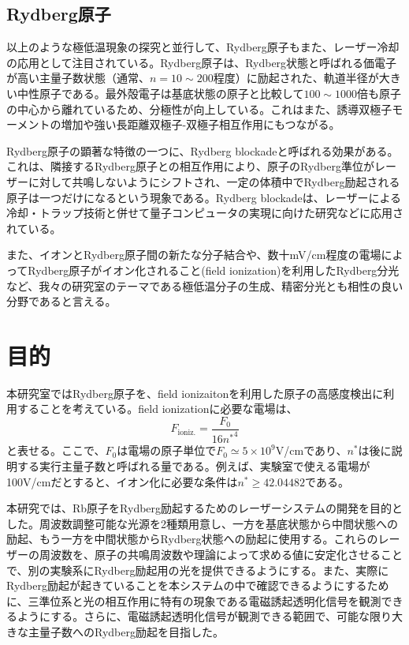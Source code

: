\documentclass[dvipdfmx]{jsreport}
\begin{document}
\subsection{Rydberg原子}
以上のような極低温現象の探究と並行して、Rydberg原子もまた、レーザー冷却の応用として注目されている。Rydberg原子は、Rydberg状態と呼ばれる価電子が高い主量子数状態（通常、$n=10\sim200$程度）に励起された、軌道半径が大きい中性原子である。最外殻電子は基底状態の原子と比較して$100\sim1000$倍も原子の中心から離れているため、分極性が向上している\cite{rydberg}。これはまた、誘導双極子モーメントの増加や強い長距離双極子-双極子相互作用にもつながる。

Rydberg原子の顕著な特徴の一つに、Rydberg blockadeと呼ばれる効果がある。これは、隣接するRydberg原子との相互作用により、原子のRydberg準位がレーザーに対して共鳴しないようにシフトされ、一定の体積中でRydberg励起される原子は一つだけになるという現象である。Rydberg blockadeは、レーザーによる冷却・トラップ技術と併せて量子コンピュータの実現に向けた研究などに応用されている。\cite{yuma}

また、イオンとRydberg原子間の新たな分子結合\cite{ion-rydberg}や、数十mV/cm程度の電場によってRydberg原子がイオン化されること(field ionization)を利用したRydberg分光\cite{yuma}など、我々の研究室のテーマである極低温分子の生成、精密分光とも相性の良い分野であると言える。
\section{目的}
本研究室ではRydberg原子を、field ionizaitonを利用した原子の高感度検出に利用することを考えている。field ionizationに必要な電場は、
\begin{equation}
    F_{\text{ioniz.}} = \frac{F_0}{16 {n^*}^4}
\end{equation}
と表せる。\cite{rucas}ここで、$F_0$は電場の原子単位で$F_0 \simeq 5 \times 10^9$V/cmであり、$n^*$は後に説明する実行主量子数と呼ばれる量である。例えば、実験室で使える電場が100V/cmだとすると、イオン化に必要な条件は$n^* \geq 42.04482$である。

本研究では、Rb原子をRydberg励起するためのレーザーシステムの開発を目的とした。周波数調整可能な光源を2種類用意し、一方を基底状態から中間状態への励起、もう一方を中間状態からRydberg状態への励起に使用する。これらのレーザーの周波数を、原子の共鳴周波数や理論によって求める値に安定化させることで、別の実験系にRydberg励起用の光を提供できるようにする。また、実際にRydberg励起が起きていることを本システムの中で確認できるようにするために、三準位系と光の相互作用に特有の現象である電磁誘起透明化信号を観測できるようにする。さらに、電磁誘起透明化信号が観測できる範囲で、可能な限り大きな主量子数へのRydberg励起を目指した。
\end{document}
